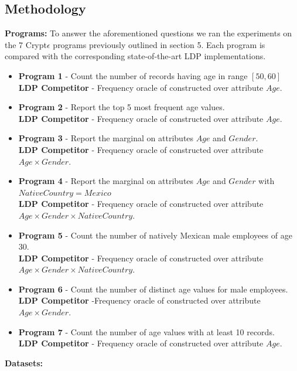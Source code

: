 \subsection{Methodology} 
\textbf{Programs:}
To answer the aforementioned questions we ran the experiments on the 7 Crypt$\epsilon$ programs previously outlined in section 5. Each program is compared with the corresponding state-of-the-art \textsf{LDP} implementations. \begin{itemize}\item \textbf{Program 1} - Count the number of records having age in range $[50,60]$ \\\textbf{\textsf{LDP} Competitor} - Frequency oracle of \cite{LDP1} constructed over attribute $Age$. \item \textbf{Program 2} - Report the top 5 most frequent age values. \\\textbf{\textsf{LDP} Competitor} - Frequency oracle of \cite{LDP1} constructed over attribute $Age$.  \item \textbf{Program 3 }- Report the marginal on attributes $Age$ and $Gender$. \\\textbf{\textsf{LDP} Competitor }- Frequency oracle of \cite{LDP1} constructed over attribute $Age \times Gender$. \item \textbf{Program 4 }- Report the marginal on attributes $Age$ and $Gender$ with $NativeCountry=Mexico$\\\textbf{\textsf{LDP} Competitor }- Frequency oracle of \cite{LDP1} constructed over attribute $Age\times Gender \times NativeCountry$. \item \textbf{Program 5 }- Count the number of natively Mexican male employees of age 30.\\\textbf{\textsf{LDP} Competitor }- Frequency oracle of \cite{LDP1} constructed over attribute $Age\times Gender \times NativeCountry$. \item \textbf{Program 6 }- Count the number of distinct age values for male employees. \\\textbf{\textsf{LDP} Competitor }-Frequency oracle of \cite{LDP1} constructed over attribute $Age\times Gender$.%
\item \textbf{Program 7 }- Count the number of age values with at least 10 records. \\\textbf{\textsf{LDP} Competitor }- Frequency oracle of \cite{LDP1} constructed over attribute $Age$. \end{itemize} \textbf{Datasets:}
